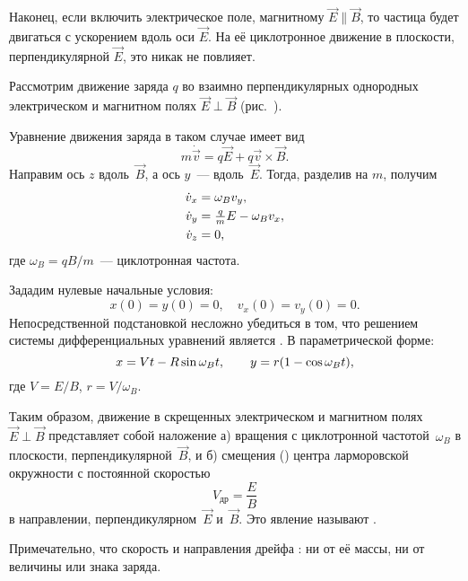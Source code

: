 
Наконец, если включить электрическое поле, 
магнитному $\vec{E}\parallel\vec{B}$, то частица будет двигаться с ускорением
вдоль оси $\vec{E}$. На её циклотронное движение в плоскости, перпендикулярной
$\vec{E}$, это никак не повлияет.


Рассмотрим движение заряда $q$ во взаимно перпендикулярных однородных
электрическом и магнитном полях $\vec{E}\perp\vec{B}$
(рис.~).

Уравнение движения заряда в таком случае имеет вид
\[
m\dot{\vec{v}} = q\vec{E} + q \vec{v}\times \vec{B}.
\]
Направим ось $z$ вдоль~$\vec{B}$, а ось $y$~--- вдоль~$\vec{E}$.
Тогда, разделив на $m$, получим
\begin{equation}
    \eqmark{3.9}
    \begin{aligned}
        \dot{v}_x&=\omega_B v_y,\\
        \dot{v}_y&=\tfrac{q}{m}E-\omega_B v_x,\\
        \dot{v}_z&=0,
\end{aligned}
\end{equation}
где $\omega_B = qB/m$~--- циклотронная частота.

Зададим нулевые начальные условия:
\[x(0)=y(0)=0,\quad v_x(0)=v_y(0)=0.\]
Непосредственной подстановкой несложно убедиться в том, что решением системы
дифференциальных уравнений является .
В параметрической форме:
\begin{equation}
    \eqmark{3.11}
    x = Vt - R\sin\omega_B t,\qquad y = r(1-\cos\omega_B t),
\end{equation}
где $V=E/B$, $r=V/\omega_B$.

Таким образом, движение в скрещенных электрическом и магнитном полях
$\vec{E}\perp \vec{B}$ представляет собой наложение
а) вращения с циклотронной частотой~$\omega_B$ в плоскости,
перпендикулярной~$\vec{B}$, и б) смещения () центра ларморовской
окружности с постоянной скоростью
\begin{equation}
    V_{др} = \frac{E}{B}
\end{equation}
в направлении, перпендикулярном~$\vec{E}$ и~$\vec{B}$. Это явление
называют .

Примечательно, что
скорость и направления дрейфа :
ни от её массы, ни от величины или знака заряда.

